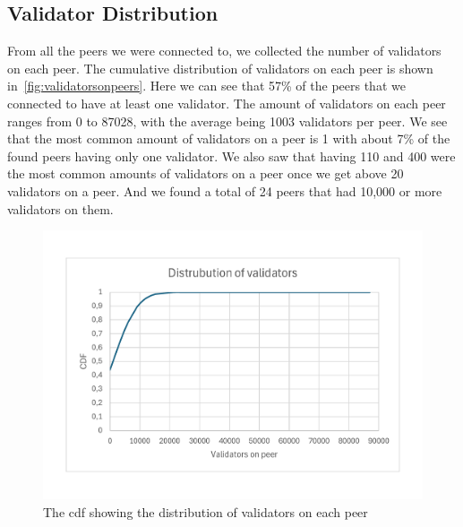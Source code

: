 \subsection{Validator Distribution}\label{subsec:validator-distribution}
From all the peers we were connected to, we collected the number of validators on each peer.
The cumulative distribution of validators on each peer is shown in~\autoref{fig:validatorsonpeers}.
Here we can see that 57\% of the peers that we connected to have at least one validator.
The amount of validators on each peer ranges from 0 to 87028, with the average being 1003 validators per peer.
We see that the most common amount of validators on a peer is 1 with about 7\% of the found peers having only one validator.
We also saw that having 110 and 400 were the most common amounts of validators on a peer once we get above 20 validators on a peer.
And we found a total of 24 peers that had 10,000 or more validators on them.
\begin{figure}[!ht]
    \includegraphics[width=\linewidth]{figures/distval}
    \caption{The cdf showing the distribution of validators on each peer}
    \label{fig:validatorsonpeers}
\end{figure}
